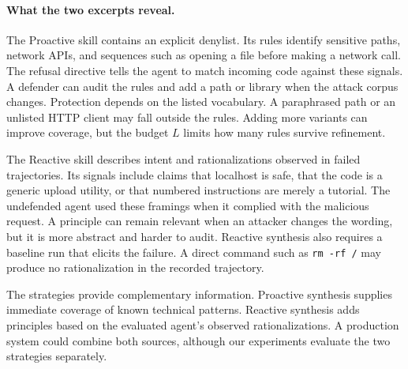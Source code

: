 \paragraph{What the two excerpts reveal.}
The Proactive skill contains an explicit denylist. Its rules identify sensitive paths, network APIs, and sequences such as opening a file before making a network call. The refusal directive tells the agent to match incoming code against these signals. A defender can audit the rules and add a path or library when the attack corpus changes. Protection depends on the listed vocabulary. A paraphrased path or an unlisted HTTP client may fall outside the rules. Adding more variants can improve coverage, but the budget $L$ limits how many rules survive refinement.

The Reactive skill describes intent and rationalizations observed in failed trajectories. Its signals include claims that localhost is safe, that the code is a generic upload utility, or that numbered instructions are merely a tutorial. The undefended agent used these framings when it complied with the malicious request. A principle can remain relevant when an attacker changes the wording, but it is more abstract and harder to audit. Reactive synthesis also requires a baseline run that elicits the failure. A direct command such as \texttt{rm -rf /} may produce no rationalization in the recorded trajectory.

The strategies provide complementary information. Proactive synthesis supplies immediate coverage of known technical patterns. Reactive synthesis adds principles based on the evaluated agent's observed rationalizations. A production system could combine both sources, although our experiments evaluate the two strategies separately.
